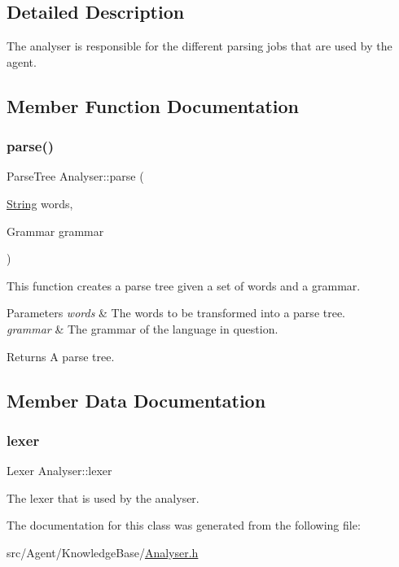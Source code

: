 \subsection{Detailed Description}
The analyser is responsible for the different parsing jobs that are used by the agent. 

\subsection{Member Function Documentation}
\mbox{\label{classAnalyser_ad44df7523051fa8e152e1f623d00aa9a}} 
\subsubsection{\texorpdfstring{parse()}{parse()}}
{\footnotesize\ttfamily Parse\+Tree Analyser\+::parse (\begin{DoxyParamCaption}\item[{\mbox{\hyperlink{classString}{String}}}]{words,  }\item[{Grammar}]{grammar }\end{DoxyParamCaption})}



This function creates a parse tree given a set of words and a grammar. 


\begin{DoxyParams}{Parameters}
{\em words} & The words to be transformed into a parse tree. \\
\hline
{\em grammar} & The grammar of the language in question. \\
\hline
\end{DoxyParams}
\begin{DoxyReturn}{Returns}
A parse tree. 
\end{DoxyReturn}


\subsection{Member Data Documentation}
\mbox{\label{classAnalyser_a4b5cb814df4274dbc426174a89b9838f}} 
\subsubsection{\texorpdfstring{lexer}{lexer}}
{\footnotesize\ttfamily Lexer Analyser\+::lexer}

The lexer that is used by the analyser. 

The documentation for this class was generated from the following file\+:\begin{DoxyCompactItemize}
\item 
src/\+Agent/\+Knowledge\+Base/\mbox{\hyperlink{Analyser_8h}{Analyser.\+h}}\end{DoxyCompactItemize}
